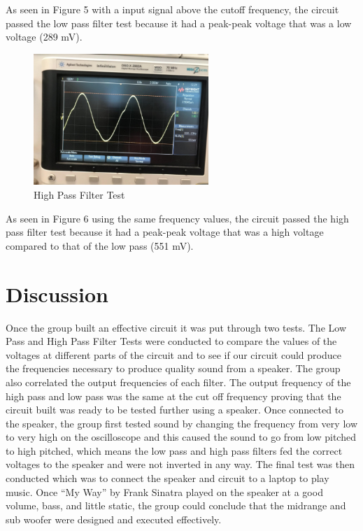 \documentclass{article}
\begin{document}
As seen in Figure 5 with a input signal above the cutoff frequency, the circuit passed the low pass filter test because it had a peak-peak voltage that was a low voltage (289 mV). 
\newpage

\begin{figure}[h]
\begin{center}
\includegraphics[width=250px]{HighPassFilterTest.png}
\caption{High Pass Filter Test}
\end{center}
\end{figure}

As seen in Figure 6 using the same frequency values, the circuit passed the high pass filter test because it had a peak-peak voltage that was a high voltage compared to that of the low pass (551 mV).   

\section{Discussion}
	Once the group built an effective circuit it was put through two tests.  The Low Pass and High Pass Filter Tests were conducted to compare the values of the voltages at different parts of the circuit and to see if our circuit could produce the frequencies necessary to produce quality sound from a speaker. The group also correlated the output frequencies of each filter. The output frequency of the high pass and low pass was the same at the cut off frequency proving that the circuit built was ready to be tested further using a speaker.  Once connected to the speaker, the group first tested sound by changing the frequency from very low to very high on the oscilloscope and this caused the sound to go from low pitched to high pitched, which means the low pass and high pass filters fed the correct voltages to the speaker and were not inverted in any way. The final test was then conducted which was to connect the speaker and circuit to a laptop to play music.  Once “My Way” by Frank Sinatra played on the speaker at a good volume, bass, and little static, the group could conclude that the midrange and sub woofer were designed and executed effectively. 
    
\end{document}
